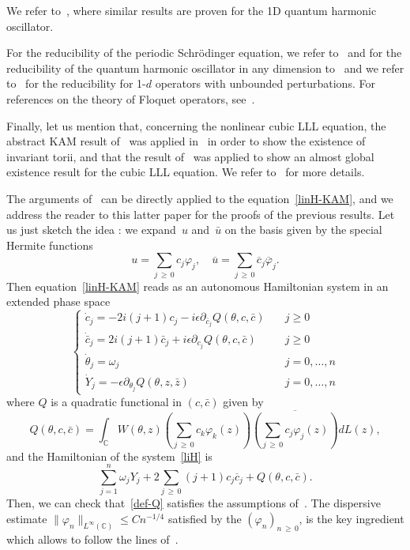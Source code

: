 \documentclass[10pt]{amsart}
\theoremstyle{definition}\newtheorem{defi}[theo]{Definition}\newtheorem{rema}[theo]{Remark}\newtheorem{exam}[theo]{Example}\newtheorem{exem}[theo]{Example}\newtheorem{nota}[theo]{Notation}
\newcommand{\C}{\mathbb{C}}
\newcommand*\eps{\epsilon}
\newcommand*\dis{\displaystyle}
\newcommand{\ov}{\overline}
\newcommand{\<}{\langle}
\renewcommand{\>}{\rangle}
\renewcommand{\phi}{\varphi}
\begin{document}
We refer to~\cite[Section~7]{Grebert-Thomann}, where similar results are proven for the 1D quantum harmonic oscillator.

For the reducibility of the periodic Schr\"odinger equation, we refer to~\cite{ElKuk2} and for the reducibility of the quantum harmonic oscillator in any dimension to~\cite{BGMR2,GP,LW} and we refer to~\cite{Bambusi2,Bambusi1,Bambusi3} for the reducibility for 1-$d$ operators with unbounded perturbations. For references on the theory of Floquet operators, see~\cite{Eli, Wang}.

Finally, let us mention that, concerning the nonlinear cubic LLL equation, the abstract KAM result of~\cite{Grebert-Thomann} was applied in~\cite[Theorem~4.3]{GGT} in order to show the existence of invariant torii, and that the result of~\cite{GIP} was applied to show an almost global existence result for the cubic LLL equation. We refer to~\cite[Section~4.2]{GGT} for more details.


The arguments of~\cite[Section~7]{Grebert-Thomann} can be directly applied to the equation~\eqref{linH-KAM}, and we address the reader to this latter paper for the proofs of the previous results. Let us just sketch the idea : we expand~$u$ and~$\bar u$ on the basis given by the special Hermite functions
\[
\dis u=\sum_{j\,\geq\,0} c_j {\phi_j}, \quad \dis \ov{u}=\sum_{j\,\geq\,0} \ov{c}_j \ov{\phi}_j.
\]
Then equation~\eqref{linH-KAM} reads as an autonomous Hamiltonian system in an extended phase space
\begin{equation}\label{liH}
\begin{cases}
\dot c_j=-2i(j+1) c_j- i\eps \partial_{\bar c_j}Q(\theta,c,\bar c)\quad & j\geq 0 \\[5pt]
\dot{\bar c}_j= 2i(j+1)\bar c_j+ i\eps \partial_{ c_j}Q(\theta,c,\bar c) & j\geq 0\\[5pt]
\dot \theta_j= \omega_j & j=0,\dots, n\\[5pt]
\dot Y_j= -\eps \partial_{ \theta_j}Q(\theta,z,\bar z) & j=0,\dots, n
\end{cases}
\end{equation}
where $Q$ is a quadratic functional in $(c,\bar c)$ given by
\begin{equation}\label{def-Q}
Q(\theta,c,\bar c)=\int_\C W(\theta,z)\left(\sum_{j\,\geq\,0} c_k \phi_k(z)\right) \ov{\left(\sum_{j\,\geq\,0} c_j {\phi_j(z)}\right)}dL(z),
\end{equation}
and the Hamiltonian of the system~\eqref{liH} is
\[
\sum_{j=1}^n \omega_j Y_j +2\sum_{j\,\geq\,0} (j+1) c_j\ov{c}_j+Q(\theta,c,\bar c).
\]
Then, we can check that~\eqref{def-Q} satisfies the assumptions of~\cite[Theorem~7.1]{Grebert-Thomann}. The dispersive estimate $\|\phi_n \|_{L^\infty(\C)} \leq C n^{-1/4}$ satisfied by the $(\phi_n)_{n\,\geq\,0}$, is the key ingredient which allows to follow the lines of~\cite[Section~7]{Grebert-Thomann}.
\end{document}
